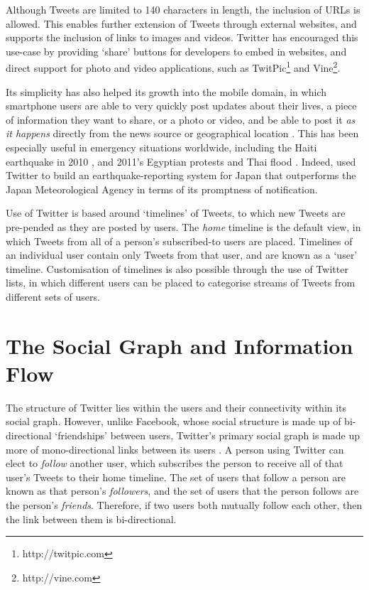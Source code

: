 Although Tweets are limited to 140 characters in length, the inclusion of URLs is allowed. This enables further extension of Tweets through external websites, and supports the inclusion of links to images and videos. Twitter has encouraged this use-case by providing `share' buttons for developers to embed in websites, and direct support for photo and video applications, such as TwitPic\footnote{http://twitpic.com} and Vine\footnote{http://vine.com}.

Its simplicity has also helped its growth into the mobile domain, in which smartphone users are able to very quickly post updates about their lives, a piece of information they want to share, or a photo or video, and be able to post it \textit{as it happens} directly from the news source or geographical location \cite{castillo11}. This has been especially useful in emergency situations worldwide, including the Haiti earthquake in 2010 \cite{muralidharan11}, and 2011's Egyptian protests \cite{wilson11} and Thai flood \cite{kongthon12}. Indeed, \citet{sakaki10} used Twitter to build an earthquake-reporting system for Japan that outperforms the Japan Meteorological Agency in terms of its promptness of notification.

Use of Twitter is based around `timelines' of Tweets, to which new Tweets are pre-pended as they are posted by users. The \textit{home} timeline is the default view, in which Tweets from all of a person's subscribed-to users are placed. Timelines of an individual user contain only Tweets from that user, and are known as a `user' timeline. Customisation of timelines is also possible through the use of Twitter lists, in which different users can be placed to categorise streams of Tweets from different sets of users.


\section{The Social Graph and Information Flow}
The structure of Twitter lies within the users and their connectivity within its social graph. However, unlike Facebook, whose social structure is made up of bi-directional `friendships' between users, Twitter's primary social graph is made up more of mono-directional links between its users \cite{edwards13}. A person using Twitter can elect to \textit{follow} another user, which subscribes the person to receive all of that user's Tweets to their home timeline. The set of users that follow a person are known as that person's \textit{followers}, and the set of users that the person follows are the person's \textit{friends}. Therefore, if two users both mutually follow each other, then the link between them is bi-directional.

